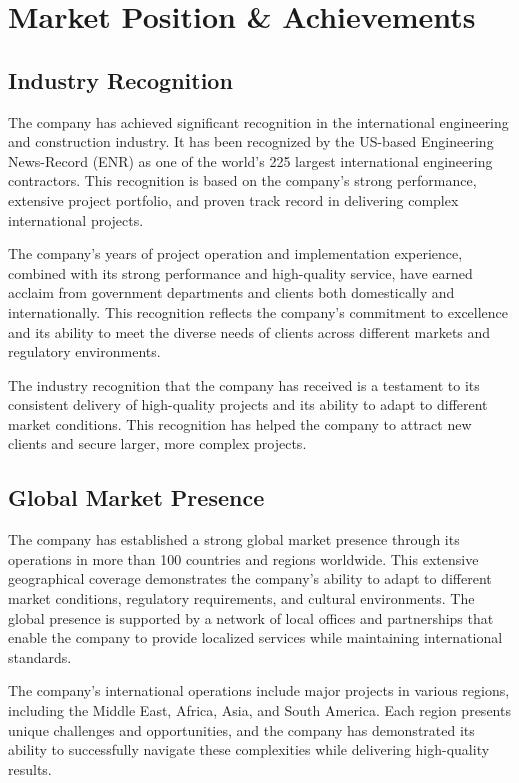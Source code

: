 \section{Market Position \& Achievements}

\subsection{Industry Recognition}
The company has achieved significant recognition in the international engineering and construction industry. It has been recognized by the US-based Engineering News-Record (ENR) as one of the world's 225 largest international engineering contractors. This recognition is based on the company's strong performance, extensive project portfolio, and proven track record in delivering complex international projects.

The company's years of project operation and implementation experience, combined with its strong performance and high-quality service, have earned acclaim from government departments and clients both domestically and internationally. This recognition reflects the company's commitment to excellence and its ability to meet the diverse needs of clients across different markets and regulatory environments.

The industry recognition that the company has received is a testament to its consistent delivery of high-quality projects and its ability to adapt to different market conditions. This recognition has helped the company to attract new clients and secure larger, more complex projects.

\subsection{Global Market Presence}
The company has established a strong global market presence through its operations in more than 100 countries and regions worldwide. This extensive geographical coverage demonstrates the company's ability to adapt to different market conditions, regulatory requirements, and cultural environments. The global presence is supported by a network of local offices and partnerships that enable the company to provide localized services while maintaining international standards.

The company's international operations include major projects in various regions, including the Middle East, Africa, Asia, and South America. Each region presents unique challenges and opportunities, and the company has demonstrated its ability to successfully navigate these complexities while delivering high-quality results.

